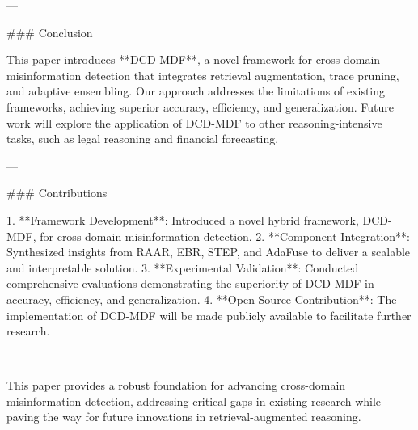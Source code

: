 ---

### Conclusion

This paper introduces **DCD-MDF**, a novel framework for cross-domain misinformation detection that integrates retrieval augmentation, trace pruning, and adaptive ensembling. Our approach addresses the limitations of existing frameworks, achieving superior accuracy, efficiency, and generalization. Future work will explore the application of DCD-MDF to other reasoning-intensive tasks, such as legal reasoning and financial forecasting.

---

### Contributions

1. **Framework Development**: Introduced a novel hybrid framework, DCD-MDF, for cross-domain misinformation detection.
2. **Component Integration**: Synthesized insights from RAAR, EBR, STEP, and AdaFuse to deliver a scalable and interpretable solution.
3. **Experimental Validation**: Conducted comprehensive evaluations demonstrating the superiority of DCD-MDF in accuracy, efficiency, and generalization.
4. **Open-Source Contribution**: The implementation of DCD-MDF will be made publicly available to facilitate further research.

---

This paper provides a robust foundation for advancing cross-domain misinformation detection, addressing critical gaps in existing research while paving the way for future innovations in retrieval-augmented reasoning.